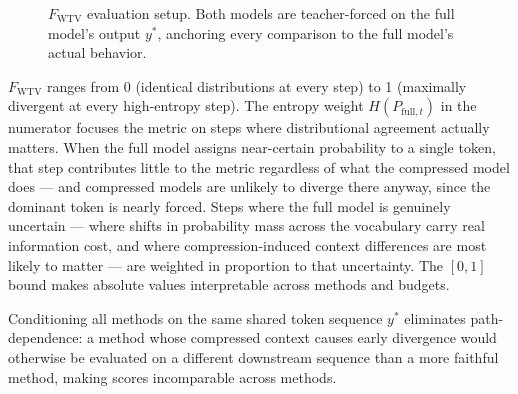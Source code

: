 \documentclass[10pt,letterpaper]{article}
\begin{document}
\begin{figure}[H]
\centering
{}
\caption{$F_{\text{WTV}}$ evaluation setup. Both models are teacher-forced on the full model's
output $y^*$, anchoring every comparison to the full model's actual behavior.}
\label{fig:eval-setup}
\end{figure}

\(F_{\text{WTV}}\) ranges from 0 (identical distributions at every step) to 1
(maximally divergent at every high-entropy step). The entropy weight
\(H(P_{\text{full},t})\) in the numerator focuses the metric on steps where
distributional agreement actually matters. When the full model assigns near-certain
probability to a single token, that step contributes little to the metric regardless
of what the compressed model does --- and compressed models are unlikely to diverge
there anyway, since the dominant token is nearly forced. Steps where the full model is
genuinely uncertain --- where shifts in probability mass across the vocabulary carry
real information cost, and where compression-induced context differences are most
likely to matter --- are weighted in proportion to that uncertainty. The \([0,1]\) bound makes
absolute values interpretable across methods and budgets.

Conditioning all methods on the same shared token sequence \(y^*\) eliminates
path-dependence: a method whose compressed context causes early divergence would
otherwise be evaluated on a different downstream sequence than a more faithful
method, making scores incomparable across methods.
\end{document}
